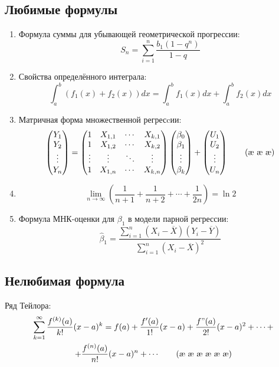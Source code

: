 \documentclass[12pt, a4paper]{article}
\begin{document}
\subsection{Любимые формулы}
\begin{enumerate}
\item Формула суммы для убывающей геометрической прогрессии:\[ S_n = \sum_{i=1}^{n} \frac{b_1(1-q^n)}{1 - q} \tag{æ}\label{aster 1} \]
\item Свойства определённого интеграла: \[ \int_a^b (f_1(x)+f_2(x))dx = \int_a^b f_1(x)dx + \int_a^b f_2(x)dx \tag{æ æ}\label{aster 2} \]
\item Матричная форма множественной регресcии: \[ 
\def \Y {\begin{pmatrix} Y_1 \\ Y_2 \\ \vdots \\ Y_n \end{pmatrix}} 
\def \X' {
\begin{pmatrix} 
1 & X_{1,1} & \cdots & X_{k,1} \\
1 & X_{1,2} & \cdots & X_{k,2} \\
\vdots & \vdots & \ddots & \vdots \\
1 & X_{1,n} & \cdots & X_{k,n} \\
\end{pmatrix}}
\def \U {\begin{pmatrix} U_1 \\ U_2 \\ \vdots \\ U_n \end{pmatrix}}
\def \b {\beta}
\def \B {\begin{pmatrix} \b_0 \\ \b_1 \\ \vdots \\ \b_k \end{pmatrix}}
\Y=\X' \B + \U \tag{æ æ æ}\label{aster 3} \]
\item \[\textstyle\lim\limits_{n \to \infty} \left(\frac{1}{n+1} + \frac{1}{n+2} + \cdots + \frac{1}{2n}\right) = \ln2 \tag{æ æ æ æ}\label{aster 4} \]
\item Формула МНК-оценки для $\beta_1$ в модели парной регрессии: \[ \hat{\beta}_1 = \frac{\sum\limits_{i=1}^{n} (X_i-\overline{X})(Y_i-\overline{Y}) }{\sum\limits_{i=1}^{n} (X_i-\overline{X})^2} \tag{æ æ æ æ æ}\label{aster 5} \] 
\end{enumerate}

\subsection{Нелюбимая формула}
Ряд Тейлора: \begin{multline}  \sum_{k=1}^{\infty} \frac{f^{(k)}(a)}{k!} (x-a)^k = f(a) + \frac{f'(a)}{1!} (x-a)+ \frac{f"(a)}{2!} (x-a)^2 + \cdots + \\ +\frac{f^{(n)}(a)}{n!} (x-a)^n+ \cdots \tag{æ æ æ æ æ æ}\label{aster 6} \end{multline}
\end{document}
